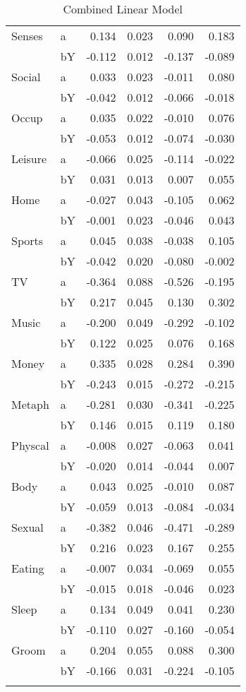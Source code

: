 \documentclass[11pt,a4paper]{article}
\begin{document}
\begin{longtable}{llrrrr}
Senses & a &  0.134 &  0.023 &    0.090 &     0.183 \\
      & bY & -0.112 &  0.012 &   -0.137 &    -0.089 \\
Social & a &  0.033 &  0.023 &   -0.011 &     0.080 \\
      & bY & -0.042 &  0.012 &   -0.066 &    -0.018 \\
Occup & a &  0.035 &  0.022 &   -0.010 &     0.076 \\
      & bY & -0.053 &  0.012 &   -0.074 &    -0.030 \\
Leisure & a & -0.066 &  0.025 &   -0.114 &    -0.022 \\
      & bY &  0.031 &  0.013 &    0.007 &     0.055 \\
Home & a & -0.027 &  0.043 &   -0.105 &     0.062 \\
      & bY & -0.001 &  0.023 &   -0.046 &     0.043 \\
Sports & a &  0.045 &  0.038 &   -0.038 &     0.105 \\
      & bY & -0.042 &  0.020 &   -0.080 &    -0.002 \\
TV & a & -0.364 &  0.088 &   -0.526 &    -0.195 \\
      & bY &  0.217 &  0.045 &    0.130 &     0.302 \\
Music & a & -0.200 &  0.049 &   -0.292 &    -0.102 \\
      & bY &  0.122 &  0.025 &    0.076 &     0.168 \\
Money & a &  0.335 &  0.028 &    0.284 &     0.390 \\
      & bY & -0.243 &  0.015 &   -0.272 &    -0.215 \\
Metaph & a & -0.281 &  0.030 &   -0.341 &    -0.225 \\
      & bY &  0.146 &  0.015 &    0.119 &     0.180 \\
Physcal & a & -0.008 &  0.027 &   -0.063 &     0.041 \\
      & bY & -0.020 &  0.014 &   -0.044 &     0.007 \\
Body & a &  0.043 &  0.025 &   -0.010 &     0.087 \\
      & bY & -0.059 &  0.013 &   -0.084 &    -0.034 \\
Sexual & a & -0.382 &  0.046 &   -0.471 &    -0.289 \\
      & bY &  0.216 &  0.023 &    0.167 &     0.255 \\
Eating & a & -0.007 &  0.034 &   -0.069 &     0.055 \\
      & bY & -0.015 &  0.018 &   -0.046 &     0.023 \\
Sleep & a &  0.134 &  0.049 &    0.041 &     0.230 \\
      & bY & -0.110 &  0.027 &   -0.160 &    -0.054 \\
Groom & a &  0.204 &  0.055 &    0.088 &     0.300 \\
      & bY & -0.166 &  0.031 &   -0.224 &    -0.105 \\
\bottomrule
\caption{Combined Linear Model}
\end{longtable}
\end{document}
